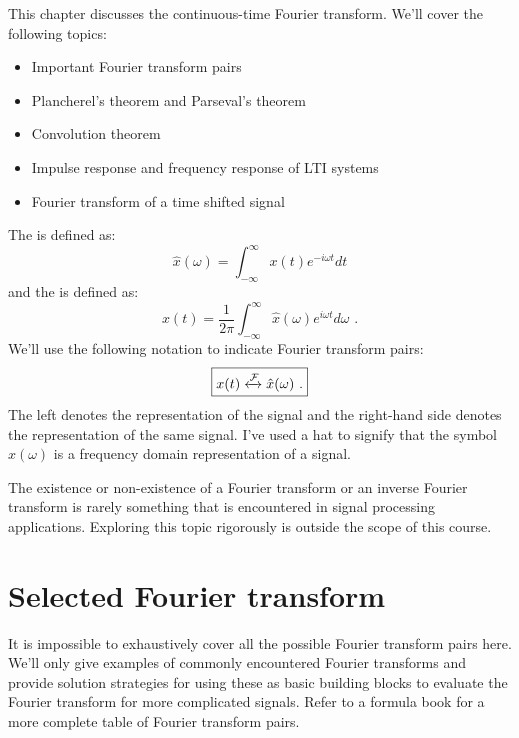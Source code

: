 This chapter discusses the continuous-time Fourier transform. We'll cover the following topics:
\begin{itemize}
    \item Important Fourier transform pairs
    \item Plancherel's theorem and Parseval's theorem 
    \item Convolution theorem
    \item Impulse response and frequency response of LTI systems
    \item Fourier transform of a time shifted signal
\end{itemize}

\noindent The \emph{} is defined as:
\begin{equation}
\boxed{
\hat{x}(\omega) = \int_{-\infty}^{\infty} x(t) e^{-i\omega t}dt}
\end{equation}
and the \emph{} is defined as:
\begin{equation}
\boxed{
x(t) = \frac{1}{2\pi}\int_{-\infty}^{\infty} \hat{x}(\omega) e^{i\omega t}d\omega\,\,.
}
\end{equation}
We'll use the following notation to indicate Fourier transform pairs:
\begin{equation}
\boxed{x(t) \xleftrightarrow{\mathcal{F}} \hat{x}(\omega)\,\,.}
\end{equation}
The left denotes the \emph{} representation of the signal and the right-hand side denotes the \emph{} representation of the same signal. 
I've used a hat to signify that the symbol $\hat{x}(\omega)$ is a frequency domain representation of a signal.

The existence or non-existence of a Fourier transform or an inverse Fourier transform is rarely something that is encountered in signal processing applications. Exploring this topic rigorously is outside the scope of this course.

\section{Selected Fourier transform}
It is impossible to exhaustively cover all the possible Fourier transform pairs here. We'll only give examples of commonly encountered Fourier transforms and provide solution strategies for using these as basic building blocks to evaluate the Fourier transform for more complicated signals. Refer to a formula book\cite{kammler2007firs} for a more complete table of Fourier transform pairs.

